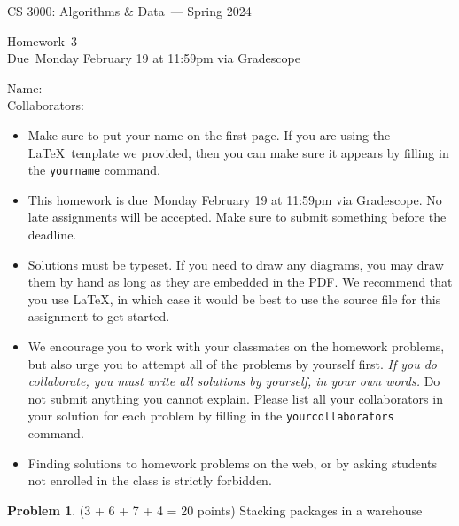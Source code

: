 \documentclass[11pt]{article}
\newcommand{\yourname}{}
\newcommand{\yourcollaborators}{}
\theoremstyle{definition}
\theoremstyle{theorem}
\newtheorem{prob}{Problem}
\newcommand{\course}{CS 3000: Algorithms \& Data}
\newcommand{\semester}{Spring 2024}
\newcommand{\hwnum}{3}
\newcommand{\hwdue}{Monday February 19 at 11:59pm via Gradescope}
\begin{document}
{\Large 
\begin{center} \course\ --- \semester\ \end{center}}
{\large
\vspace{10pt}
\noindent Homework~\hwnum \vspace{2pt}\\
Due~\hwdue}

\vspace{15pt}
\bigskip
{\large
\noindent Name: \yourname \vspace{2pt}\\ Collaborators: \yourcollaborators}

\vspace{15pt}
\begin{itemize}

\item
  Make sure to put your name on the first page.  If you are using the
  \LaTeX~template we provided, then you can make sure it appears by
  filling in the \texttt{yourname} command.

\item This homework is due~\hwdue.  No late assignments will be accepted.  Make sure to submit something before the deadline.

\item Solutions must be typeset.  If you need to draw any diagrams,
  you may draw them by hand as long as they are embedded in the PDF.
  We recommend that you use \LaTeX, in which case it would be best to
  use the source file for this assignment to get started.

\item We encourage you to work with your classmates on the homework
  problems, but also urge you to attempt all of the problems by
  yourself first. \emph{If you do collaborate, you must write all
    solutions by yourself, in your own words.}  Do not submit anything
  you cannot explain.  Please list all your collaborators in your
  solution for each problem by filling in the
  \texttt{yourcollaborators} command.

\item Finding solutions to homework problems on the web, or by asking
  students not enrolled in the class is strictly forbidden.

\end{itemize}
\newpage

\begin{prob}
	(3 + 6 + 7 + 4 = 20 points) Stacking packages in a warehouse
\end{prob}
\end{document}
